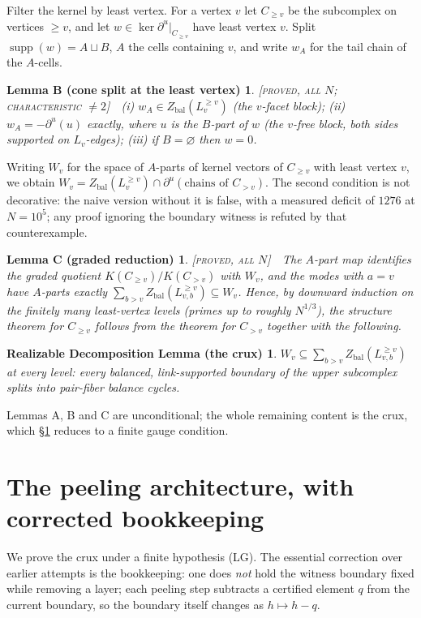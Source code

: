 \documentclass[11pt,reqno]{amsart}
\theoremstyle{plain}
\theoremstyle{definition}
\theoremstyle{plain}
\newtheorem*{lemB}{Lemma B (cone split at the least vertex)}
\newtheorem*{lemC}{Lemma C (graded reduction)}
\newtheorem*{RDL}{Realizable Decomposition Lemma (the crux)}
\theoremstyle{definition}
\newcommand{\Zbal}{Z_{\mathrm{bal}}}
\newcommand{\dbu}{\partial^{u}}
\newcommand{\st}{\textsc}
\begin{document}
Filter the kernel by least vertex. For a vertex $v$ let $C_{\ge v}$ be the subcomplex on
vertices $\ge v$, and let $w\in\ker\dbu|_{C_{\ge v}}$ have least vertex $v$. Split
$\operatorname{supp}(w)=A\sqcup B$, $A$ the cells containing $v$, and write $w_A$ for the tail
chain of the $A$-cells.
\begin{lemB}
\textnormal{\st{[proved, all $N$; characteristic $\ne2$]}}\ \ \emph{(i)}
$w_A\in\Zbal(L_v^{\ge v})$ (the $v$-facet block); \emph{(ii)} $w_A=-\dbu(u)$ exactly, where $u$
is the $B$-part of $w$ (the $v$-free block, both sides supported on $L_v$-edges); \emph{(iii)}
if $B=\varnothing$ then $w=0$.
\end{lemB}
\noindent Writing $W_v$ for the space of $A$-parts of kernel vectors of $C_{\ge v}$ with least
vertex $v$, we obtain $W_v=\Zbal(L_v^{\ge v})\cap\dbu(\text{chains of }C_{>v})$. The second
condition is not decorative: the naive version without it is false, with a measured deficit of
$1276$ at $N=10^5$; any proof ignoring the boundary witness is refuted by that counterexample.

\begin{lemC}
\textnormal{\st{[proved, all $N$]}}\ \ The $A$-part map identifies the graded quotient
$K(C_{\ge v})/K(C_{>v})$ with $W_v$, and the modes with $a=v$ have $A$-parts exactly
$\sum_{b>v}\Zbal(L_{v,b}^{\ge v})\subseteq W_v$. Hence, by downward induction on the finitely
many least-vertex levels (primes up to roughly $N^{1/3}$), the structure theorem for $C_{\ge v}$
follows from the theorem for $C_{>v}$ together with the following.
\end{lemC}
\begin{RDL}
$W_v\subseteq\sum_{b>v}\Zbal(L_{v,b}^{\ge v})$ at every level: every balanced, link-supported
boundary of the upper subcomplex splits into pair-fiber balance cycles.
\end{RDL}
\noindent Lemmas A, B and C are unconditional; the whole remaining content is the crux, which
\S\ref{sec:peel} reduces to a finite gauge condition.

\section{The peeling architecture, with corrected bookkeeping}\label{sec:peel}

We prove the crux under a finite hypothesis (LG). The essential correction over earlier attempts
is the bookkeeping: one does \emph{not} hold the witness boundary fixed while removing a layer;
each peeling step subtracts a certified element $q$ from the current boundary, so the boundary
itself changes as $h\mapsto h-q$.
\end{document}
